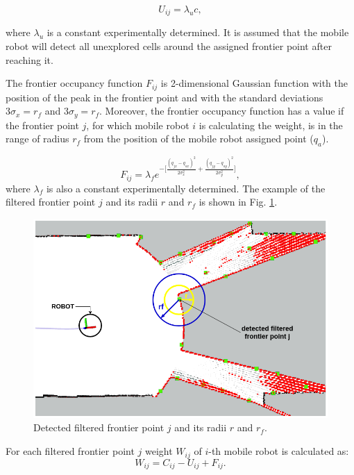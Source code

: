 \documentclass[letterpaper, 10 pt, conference]{ieeeconf}  %
\begin{document}
\begin{equation}
    U_{ij} = \lambda_{u}c,
\end{equation}

where $\lambda_{u}$ is a constant experimentally determined. It is assumed that the mobile robot will detect all unexplored cells around the assigned frontier point after reaching it. 

The frontier occupancy function $F_{ij}$ is 2-dimensional Gaussian function with the position of the peak in the frontier point and with the standard deviations $3\sigma_{x}=r_{f}$ and $3\sigma_{y}=r_{f}$. Moreover, the frontier occupancy function has a value if the frontier point $j$, for which mobile robot $i$ is calculating the weight, is in the range of radius $r_{f}$ from the position of the mobile robot assigned point ($q_{a}$). 

\begin{equation}
    F_{ij} =  \lambda_{f} e^{-\Big[\frac{(q_{jx} - q_{ax})^2}{2\sigma_{x}^2} + \frac{(q_{jy} - q_{ay})^2}{2\sigma_{y}^2}\Big]},
\end{equation}
where $\lambda_{f}$  is also  a constant experimentally determined. The example of the filtered frontier point $j$ and its radii $r$ and $r_{f}$ is shown in Fig. \ref{fig:radijusi}.

\begin{figure}[b!]
	\centering\includegraphics[width=0.85\columnwidth]{rviz_radius_vol3.png}
	\caption{Detected filtered frontier point $j$ and its radii $r$ and $r_{f}$.}
	\label{fig:radijusi}
\end{figure}

For each filtered frontier point $j$ weight $W_{ij}$ of $i$-th mobile robot is calculated as: 
\begin{equation}
   {W}_{ij}= {C_{ij}} - {U_{ij}} + {F_{ij}}.
   \label{weight}
\end{equation}
\end{document}
